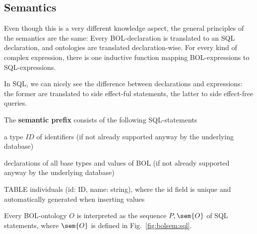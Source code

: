 \subsection{Semantics}

Even though this is a very different knowledge aspect, the general principles of the semantics are the same:
Every BOL-declaration is translated to an SQL declaration, and ontologies are translated declaration-wise.
For every kind of complex expression, there is one inductive function mapping BOL-expressions to SQL-expressions.

In SQL, we can nicely see the difference between declarations and expressions: the former are translated to side effect-ful statements, the latter to side effect-free queries.

\begin{definition}\label{def:bolsem:sql}
The \textbf{semantic prefix} consists of the following SQL-statements
\begin{compactitem}
 \item a type $ID$ of identifiers (if not already supported anyway by the underlying database)
 \item declarations of all base types and values of BOL (if not already supported anyway by the underlying database)
 \item TABLE individuals (id: ID, name: string), where the id field is unique and automatically generated when inserting values
\end{compactitem}

Every BOL-ontology $O$ is interpreted as the sequence $P,\sem{O}$ of SQL statements, where $\sem{O}$ is defined in Fig.~\ref{fig:bolsem:sql}.
\end{definition}

